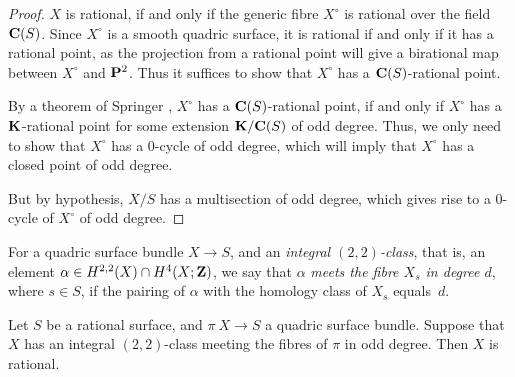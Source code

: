 \begin{proof}
    $X$ is rational, if and only if the generic fibre $X^\circ$ is rational over the field $\bbC (S)$.
    Since $X^\circ$ is a smooth quadric surface, it is rational if and only if
    it has a rational point, as the projection from a rational point 
    will give a birational map between $X^\circ$ and $\bbP^2$.
    Thus it suffices to show that $X^\circ$ has a $\bbC (S)$-rational point.

    By a theorem of Springer \cite{springer},
    $X^\circ$ has a $\bbC (S)$-rational point, 
    if and only if $X^\circ$ has a $\bbK$-rational point for some extension $\bbK / \bbC(S)$ of odd degree.
    Thus, we only need to show that $X^\circ$ has a $0$-cycle of odd degree,
    which will imply that $X^\circ$ has a closed point of odd degree.

    But by hypothesis, $X/S$ has a multisection of odd degree,
    which gives rise to a $0$-cycle of $X^\circ$ of odd degree.
\end{proof}

For a quadric surface bundle $X \to S$, and an \emph{integral $(2,2)$-class},
that is, an element $\alpha \in H^{2,2} (X) \cap H^4 (X; \bbZ)$,
we say that $\alpha$ \emph{meets the fibre $X_s$ in degree $d$}, where $s \in S$,
if the pairing of $\alpha$ with the homology class of $X_s$ equals~$d$.

\begin{lemma} \label{lem-7-rational}
    Let $S$ be a rational surface, and $\pi \: X \to S$ a quadric surface bundle.
    Suppose that $X$ has an integral $(2,2)$-class meeting the fibres of $\pi$ in odd degree.
    Then $X$ is rational.
\end{lemma}

